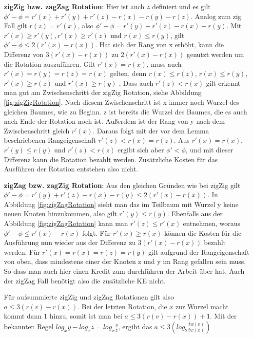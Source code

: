 \documentclass[11pt, a4paper]{article}
\begin{document}
\noindent\textbf {zigZig bzw. zagZag Rotation}:
Hier ist auch $z$ definiert und es gilt  $\phi' - \phi = r'(x) + r'(y)+ r'(z) - r(x) - r(y) - r(z)$. Analog zum zig Fall gilt  $r(z) = r'(x)$, also   $\phi' - \phi =r'(y)+ r'(z) - r(x) - r(y)$. Mit $r'(x) \geq r'(y), r'(x) \geq r'(z)$ und $r(x) \leq r(y) $, gilt $\phi' - \phi \leq 2(r'(x) - r(x))$. Hat sich der Rang von x erhöht, kann die Differenz von $3(r'(x) - r(x))$ zu $2(r'(x) - r(x))$ genutzt werden um die Rotation auszuführen. 
\noindent Gilt $r'(x) = r(x)$, muss auch $r'(x) = r(y) = r(z) = r(x)$ gelten, denn $r(x) \leq r(z)$, $r(x) \leq r(y)$,  $r'(x) \geq r(z)$ und  $r'(x) \geq r(y)$ . Dass auch $r'(z) < r(x)$ gilt erkennt man gut am Zwischenschritt der zigZig Rotation, siehe Abbildung \ref{fig:zigZigRotation}. Nach diesem Zwischenschritt ist x immer noch Wurzel des gleichen Baumes, wie zu Beginn. z ist bereits die Wurzel des Baumes, die es auch nach Ende der Rotation noch ist. Außerdem ist der Rang von y nach dem Zwischenschritt gleich $r'(x)$. Daraus folgt mit der vor dem Lemma beschriebenen Rangeigenschaft $r'(z) < r(x) = r(z) $. Aus $r'(x) = r(x)$,  $r'(y) \leq r(y)$ und 
$r'(z) < r(z) $ ergibt sich aber $\phi' < \phi$, und mit dieser Differenz kann die Rotation bezahlt werden. 
\noindent Zusätzliche Kosten für das Ausführen der Rotation entstehen also nicht.

\noindent\textbf {zigZag bzw. zagZig Rotation}:
\noindent Aus den gleichen Gründen wie bei zigZig gilt  $\phi' - \phi =r'(y)+ r'(z) - r(x) - r(y) \leq 2(r'(x) - r(x))$. In Abbildung \ref{fig:zigZagRotation} sieht man das im Teilbaum mit Wurzel y keine neuen Knoten hinzukommen, also gilt $r'(y) \leq r(y)$. Ebenfalls aus der Abbildung \ref{fig:zigZagRotation} kann man $r'(z) \leq r'(x)$ entnehmen, woraus  $\phi' - \phi \leq r'(x) - r(x)$ folgt. Für $r'(x) \geq r(x)$ können die Kosten für die Ausführung nun wieder aus der Differenz zu $3(r'(x) - r(x))$ bezahlt werden.
\noindent Für $r'(x) = r(x) = r(z) = r(y)$  gilt aufgrund der Rangeigenschaft von oben, dass mindestens einer der Knoten z und y im Rang gefallen sein muss. So dass man auch hier einen Kredit zum durchführen der Arbeit über hat. Auch der zigZag Fall benötigt also die zusätzliche KE nicht.

\noindent Für aufsummierte zigZig und zigZag Rotationen gilt also $a \leq 3(r(v) - r(x) )$. Bei der letzten Rotation, die $x$ zur Wurzel macht kommt dann $1$ hinzu, somit ist man bei  $a \leq 3(r(v) - r(x)) + 1 $. Mit der bekannten Regel $log_x y - log_x z = log_x \frac{y}{z}$, ergibt das $a \leq 3(log_2 \frac{tw(v)}{tw(x)})$\\
\end{document}
